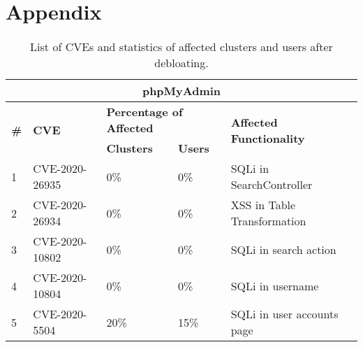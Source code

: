 \section{Appendix}

\begin{table*}[]
    \caption{List of CVEs and statistics of affected clusters and users after debloating.}
    \label{tab:cve_details}
    \centering
    \begin{adjustbox}{max width=0.65\textwidth}
    \begin{tabular}{|lllll|}
    \hline
    \multicolumn{5}{|c|}{\textbf{phpMyAdmin}}                                                                                                                                                                                                 \\ \hline
    \multicolumn{1}{|l|}{\multirow{2}{*}{\textbf{\#}}} & \multicolumn{1}{l|}{\multirow{2}{*}{\textbf{CVE}}} & \multicolumn{2}{l|}{\textbf{Percentage of Affected}}                         & \multirow{2}{*}{\textbf{Affected Functionality}} \\ \cline{3-4}
    \multicolumn{1}{|l|}{}            & \multicolumn{1}{l|}{}                 & \multicolumn{1}{l|}{\textbf{Clusters}} & \multicolumn{1}{l|}{\textbf{Users}} &                                 \\ \hline
    \multicolumn{1}{|l|}{1}           & \multicolumn{1}{l|}{CVE-2020-26935}   & \multicolumn{1}{l|}{0\%}                  & \multicolumn{1}{l|}{0\%}               & SQLi in SearchController        \\ \hline
    \multicolumn{1}{|l|}{2}           & \multicolumn{1}{l|}{CVE-2020-26934}   & \multicolumn{1}{l|}{0\%}                  & \multicolumn{1}{l|}{0\%}               & XSS in Table Transformation     \\ \hline
    \multicolumn{1}{|l|}{3}           & \multicolumn{1}{l|}{CVE-2020-10802}   & \multicolumn{1}{l|}{0\%}                  & \multicolumn{1}{l|}{0\%}               & SQLi in search action           \\ \hline
    \multicolumn{1}{|l|}{4}           & \multicolumn{1}{l|}{CVE-2020-10804}   & \multicolumn{1}{l|}{0\%}                  & \multicolumn{1}{l|}{0\%}               & SQLi in username                \\ \hline
    \multicolumn{1}{|l|}{5}           & \multicolumn{1}{l|}{CVE-2020-5504}    & \multicolumn{1}{l|}{20\%}                 & \multicolumn{1}{l|}{15\%}              & SQLi in user accounts page      \\ \hline

\end{tabular}
\end{adjustbox}
\end{table*}

